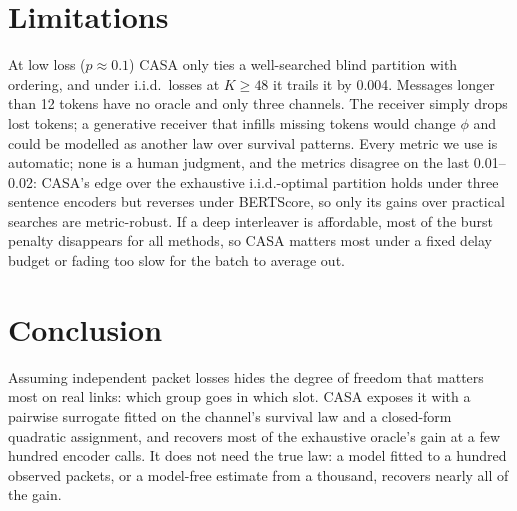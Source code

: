 \documentclass[journal,onecolumn,11pt,draftclsnofoot]{IEEEtran}
\begin{document}
\section{Limitations}
At low loss ($p\approx0.1$) CASA only ties a well-searched blind partition with ordering, and under i.i.d.\ losses at $K\ge48$ it trails it by 0.004. Messages longer than 12 tokens have no oracle and only three channels. The receiver simply drops lost tokens; a generative receiver that infills missing tokens would change $\phi$ and could be modelled as another law over survival patterns. Every metric we use is automatic; none is a human judgment, and the metrics disagree on the last 0.01--0.02: CASA's edge over the exhaustive i.i.d.-optimal partition holds under three sentence encoders but reverses under BERTScore, so only its gains over practical searches are metric-robust. If a deep interleaver is affordable, most of the burst penalty disappears for all methods, so CASA matters most under a fixed delay budget or fading too slow for the batch to average out.

\section{Conclusion}
Assuming independent packet losses hides the degree of freedom that matters most on real links: which group goes in which slot. CASA exposes it with a pairwise surrogate fitted on the channel's survival law and a closed-form quadratic assignment, and recovers most of the exhaustive oracle's gain at a few hundred encoder calls. It does not need the true law: a model fitted to a hundred observed packets, or a model-free estimate from a thousand, recovers nearly all of the gain.



\end{document}
